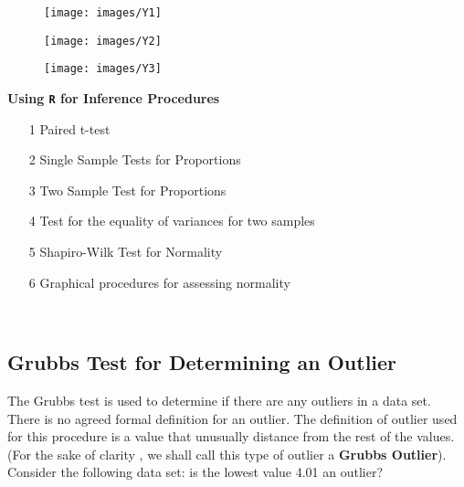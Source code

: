 \documentclass[]{report}
\begin{document}
	
	
	
	
	\begin{figure}
		\centering
		\texttt{[image: images/Y1]}
		
	\end{figure}
	
	
	\begin{figure}
		\centering
		\texttt{[image: images/Y2]}
		
	\end{figure}	
	
	
	
	\begin{figure}
		\centering
		\texttt{[image: images/Y3]}
		
	\end{figure}
	
			
			
			
			\textbf{Using \texttt{R} for Inference Procedures}
			\begin{itemize}
				\item [1] Paired t-test
				\item [2] Single Sample Tests for Proportions
				\item [3] Two Sample Test for Proportions
				\item [4] Test for the equality of variances for two samples
				\item [5] Shapiro-Wilk Test for Normality
				\item [6] Graphical procedures for assessing normality
			\end{itemize}
			









\
\subsection{Grubbs Test for Determining an Outlier}

The Grubbs test is used to determine if there are any outliers in a data set.\\ \bigskip
There is no agreed formal definition for an outlier. The definition of outlier used for this procedure is a value that unusually distance from the rest of the values.\\  (For the sake of clarity , we shall call this type of outlier a \textbf{Grubbs Outlier}).\\ Consider the following data set: is the lowest value 4.01 an outlier?
\end{document}
